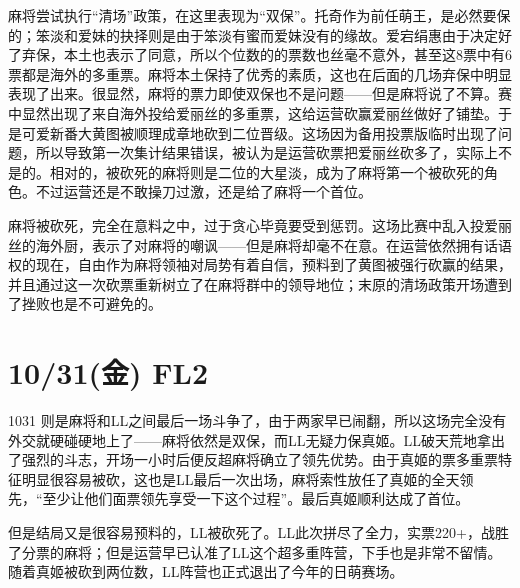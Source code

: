 麻将尝试执行“清场”政策，在这里表现为“双保”。托奇作为前任萌王，是必然要保的；笨淡和爱妹的抉择则是由于笨淡有蜜而爱妹没有的缘故。爱宕绢惠由于决定好了弃保，本土也表示了同意，所以个位数的的票数也丝毫不意外，甚至这8票中有6票都是海外的多重票。麻将本土保持了优秀的素质，这也在后面的几场弃保中明显表现了出来。很显然，麻将的票力即使双保也不是问题——但是麻将说了不算。赛中显然出现了来自海外投给爱丽丝的多重票，这给运营砍赢爱丽丝做好了铺垫。于是可爱新番大黄图被顺理成章地砍到二位晋级。这场因为备用投票版临时出现了问题，所以导致第一次集计结果错误，被认为是运营砍票把爱丽丝砍多了，实际上不是的。相对的，被砍死的麻将则是二位的大星淡，成为了麻将第一个被砍死的角色。不过运营还是不敢操刀过激，还是给了麻将一个首位。

麻将被砍死，完全在意料之中，过于贪心毕竟要受到惩罚。这场比赛中乱入投爱丽丝的海外厨，表示了对麻将的嘲讽——但是麻将却毫不在意。在运营依然拥有话语权的现在，自由作为麻将领袖对局势有着自信，预料到了黄图被强行砍赢的结果，并且通过这一次砍票重新树立了在麻将群中的领导地位；末原的清场政策开场遭到了挫败也是不可避免的。

\section{10/31(金) FL2}


1031 则是麻将和LL之间最后一场斗争了，由于两家早已闹翻，所以这场完全没有外交就硬碰硬地上了——麻将依然是双保，而LL无疑力保真姬。LL破天荒地拿出了强烈的斗志，开场一小时后便反超麻将确立了领先优势。由于真姬的票多重票特征明显很容易被砍，这也是LL最后一次出场，麻将索性放任了真姬的全天领先，“至少让他们面票领先享受一下这个过程”。最后真姬顺利达成了首位。

但是结局又是很容易预料的，LL被砍死了。LL此次拼尽了全力，实票220+，战胜了分票的麻将；但是运营早已认准了LL这个超多重阵营，下手也是非常不留情。随着真姬被砍到两位数，LL阵营也正式退出了今年的日萌赛场。

